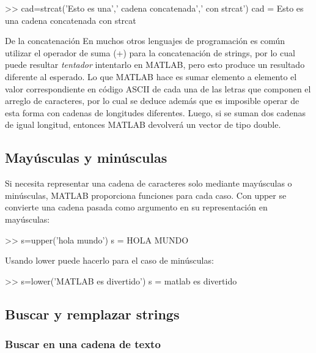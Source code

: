 \begin{matlab}
>> cad=strcat('Esto es una',' cadena concatenada',' con strcat')
cad =
Esto es una cadena concatenada con strcat
\end{matlab}


\begin{informacion}{De la concatenación}
En muchos otros lenguajes de programación
es común utilizar el operador de suma (+) para la
concatenación de strings, por lo cual puede resultar
\emph{tentador} intentarlo en MATLAB, pero esto produce
un resultado diferente al esperado. Lo que MATLAB hace
es sumar elemento a elemento el valor correspondiente en código ASCII de
cada una de las letras que componen el arreglo de
caracteres, por lo cual se deduce además que es
imposible operar de esta forma con cadenas de longitudes
diferentes. Luego, si se suman dos cadenas de igual 
longitud, entonces MATLAB devolverá un vector de tipo double.
\end{informacion}


\subsection{Mayúsculas y minúsculas}\label{mayusculas-y-minusculas}

Si necesita representar una cadena de caracteres solo mediante
mayúsculas o minúsculas, MATLAB proporciona funciones para cada caso.
Con upper se convierte una cadena pasada como argumento en su
representación en mayúsculas:

\begin{matlab}
>> s=upper('hola mundo')
s =
HOLA MUNDO
\end{matlab}

Usando lower puede hacerlo para el caso de minúsculas:

\begin{matlab}
>> s=lower('MATLAB es divertido')
s =
matlab es divertido
\end{matlab}

\subsection{Buscar y remplazar strings}\label{buscar-y-remplazar-strings}

\subsubsection{Buscar en una cadena de texto}\label{buscar-en-una-cadena-de-texto}


